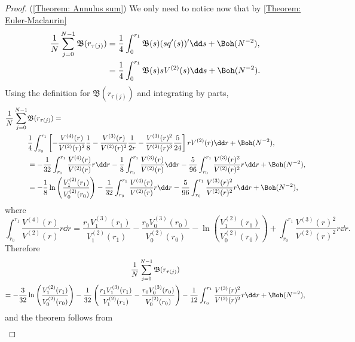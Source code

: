 \begin{proof} (\autoref{Theorem: Annulus sum})
	We only need to notice now that by \autoref{Theorem: Euler-Maclaurin}
	\begin{align}
		\frac{1}{N} \sum_{j=0}^{N-1} \mathfrak{B}(r_{\tau(j)}) & = \frac{1}{4} \int_{0}^{r_1} \mathfrak{B}(s) (s q'(s))' \dd s + \Boh(N^{-2}), \\
		& = \frac{1}{4} \int_{0}^{r_1} \mathfrak{B}(s) s V^{(2)}(s) \dd s + \Boh(N^{-2}).
	\end{align}
	Using the definition for $\mathfrak{B}(r_{\tau(j)})$ and integrating by parts,
	\begin{align}
		\frac{1}{N} \sum_{j=0}^{N-1} & \mathfrak{B}(r_{\tau(j)}) = \\
		& \frac{1}{4} \int_{r_0}^{r_1} \left[ -\frac{V^{(4)}(r)}{V^{(2)}(r)^2} \frac{1}{8} - \frac{V^{(3)}(r)}{V^{(2)}(r)^{2}} \frac{1}{2 r} - \frac{V^{(3)}(r)^2}{V^{(2)}(r)^{3}} \frac{5}{24} \right] r V^{(2)}(r) \dd r + \Boh(N^{-2}),\\
		& = - \frac{1}{32} \int_{r_0}^{r_1} \frac{V^{(4)}(r)}{V^{(2)}(r)} r \dd r - \frac{1}{8} \int_{r_0}^{r_1} \frac{V^{(3)}(r)}{V^{(2)}(r)} \dd r - \frac{5}{96} \int_{r_0}^{r_1} \frac{V^{(3)}(r)^2}{V^{(2)}(r)^{2}} r \dd r + \Boh(N^{-2}),\\
		& = - \frac{1}{8} \ln\left( \frac{V^{(2)}_1(r_1)}{V^{(2)}_0(r_0)} \right) - \frac{1}{32} \int_{r_0}^{r_1} \frac{V^{(4)}(r)}{V^{(2)}(r)} r \dd r - \frac{5}{96} \int_{r_0}^{r_1} \frac{V^{(3)}(r)^2}{V^{(2)}(r)^{2}} r \dd r + \Boh(N^{-2}),
	\end{align}
	where
	\begin{equation}
		 \int_{r_0}^{r_1} \frac{V^{(4)}(r)}{V^{(2)}(r)} r \dd r =  \frac{r_1  V^{(3)}_1(r_1)}{V^{(2)}_1(r_1)} - \frac{r_0 V^{(3)}_0(r_0)}{V^{(2)}_0(r_0)} - \ln \left( \frac{V^{(2)}_1(r_1)}{V^{(2)}_0(r_0)}\right) +   \int_{r_0}^{r_1} \frac{V^{(3)}(r)^2}{V^{(2)}(r)^{2}} r \dd r.
	\end{equation}
	Therefore
	\begin{multline}
			\frac{1}{N} \sum_{j=0}^{N-1} \mathfrak{B}(r_{\tau(j)})  \\ = - \frac{3}{32} \ln\left( \frac{V^{(2)}_1(r_1)}{V^{(2)}_0(r_0)} \right) - \frac{1}{32} \left( \frac{r_1  V^{(3)}_1(r_1)}{V^{(2)}_1(r_1)} - \frac{r_0 V^{(3)}_0(r_0)}{V^{(2)}_0(r_0)}\right) - \frac{1}{12} \int_{r_0}^{r_1} \frac{V^{(3)}(r)^2}{V^{(2)}(r)^{2}} r \dd r + \Boh(N^{-2}),
			\label{Equation: Summation on B}
	\end{multline}
	and the theorem follows from
	\begin{multline}

\end{multline}
\end{proof}
